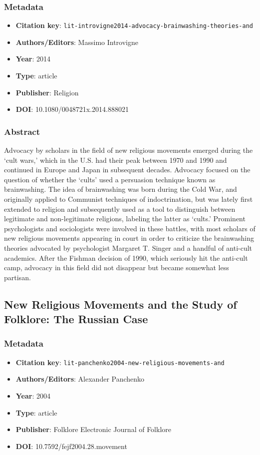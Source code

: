\subsubsection*{Metadata}
\begin{itemize}
  \item \textbf{Citation key}: \texttt{lit-introvigne2014-advocacy-brainwashing-theories-and}
  \item \textbf{Authors/Editors}: Massimo Introvigne
  \item \textbf{Year}: 2014
  \item \textbf{Type}: article
  \item \textbf{Publisher}: Religion
  \item \textbf{DOI}: 10.1080/0048721x.2014.888021
\end{itemize}
\subsubsection*{Abstract}
Advocacy by scholars in the field of new religious movements emerged during the ‘cult wars,’ which in the U.S. had their peak between 1970 and 1990 and continued in Europe and Japan in subsequent decades. Advocacy focused on the question of whether the ‘cults’ used a persuasion technique known as brainwashing. The idea of brainwashing was born during the Cold War, and originally applied to Communist techniques of indoctrination, but was lately first extended to religion and subsequently used as a tool to distinguish between legitimate and non-legitimate religions, labeling the latter as ‘cults.’ Prominent psychologists and sociologists were involved in these battles, with most scholars of new religious movements appearing in court in order to criticize the brainwashing theories advocated by psychologist Margaret T. Singer and a handful of anti-cult academics. After the Fishman decision of 1990, which seriously hit the anti-cult camp, advocacy in this field did not disappear but became somewhat less partisan.

\subsection{New Religious Movements and the Study of Folklore: The Russian Case}\label{lit:lit-panchenko2004-new-religious-movements-and}
\subsubsection*{Metadata}
\begin{itemize}
  \item \textbf{Citation key}: \texttt{lit-panchenko2004-new-religious-movements-and}
  \item \textbf{Authors/Editors}: Alexander Panchenko
  \item \textbf{Year}: 2004
  \item \textbf{Type}: article
  \item \textbf{Publisher}: Folklore Electronic Journal of Folklore
  \item \textbf{DOI}: 10.7592/fejf2004.28.movement
\end{itemize}
